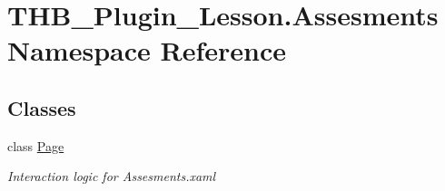 \hypertarget{namespace_t_h_b___plugin___lesson_1_1_assesments}{}\section{T\+H\+B\+\_\+\+Plugin\+\_\+\+Lesson.\+Assesments Namespace Reference}
\label{namespace_t_h_b___plugin___lesson_1_1_assesments}
\subsection*{Classes}
\begin{DoxyCompactItemize}
\item 
class \mbox{\hyperlink{class_t_h_b___plugin___lesson_1_1_assesments_1_1_page}{Page}}
\begin{DoxyCompactList}\small\item\em Interaction logic for Assesments.\+xaml \end{DoxyCompactList}\end{DoxyCompactItemize}
